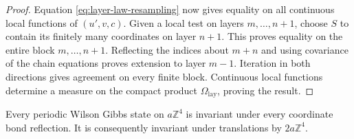 \documentclass[11pt,letterpaper,reqno]{amsart}
\makeatletter
\theoremstyle{definition}
\newcommand{\ms@minorstart}{%
  \pushQED{\qed}\renewcommand{\qedsymbol}{$\blacksquare$}}
\newenvironment{proposition}[1][]{\ms@minorstart\ms@proposition[#1]}
  {\popQED\endms@proposition}
\theoremstyle{remark}
\makeatother
\begin{document}
\begin{proof}
Equation \eqref{eq:layer-law-resampling} now gives equality on all
continuous local functions of $(u',v,c)$. Given a local test on
layers $m,\ldots,n+1$, choose $S$ to contain its finitely many
coordinates on layer $n+1$. This proves equality on the entire
block $m,\ldots,n+1$. Reflecting the indices about $m+n$ and using
covariance of the chain equations proves extension to layer $m-1$.
Iteration in both directions gives agreement on every finite block.
Continuous local functions determine a measure on the compact
product $\Omega_{\mathrm{lay}}$, proving the result.
\end{proof}

\begin{proposition}\label{prop:periodic-bond-reflections}
Every periodic Wilson Gibbs state on $a\mathbb Z^4$ is invariant
under every coordinate bond reflection. It is consequently invariant
under translations by $2a\mathbb Z^4$.
\end{proposition}
\end{document}
